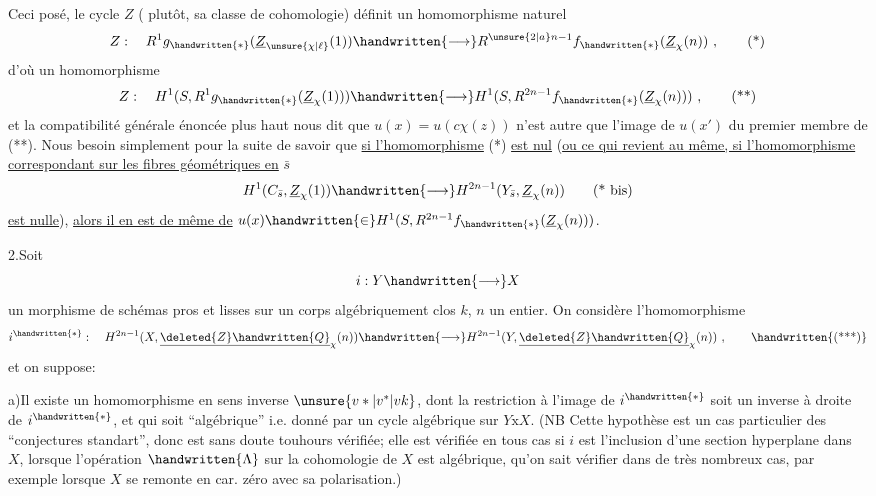 Ceci posé, le cycle $Z$ ( plutôt, sa classe de cohomologie) définit un homomorphisme naturel
\[
Z:\quad R^1g_{\handwritten{*}}(\underline{Z}_{\unsure{\chi|\ell}}(1))\handwritten{\longrightarrow}R^{\unsure{2|a}n-1}f_{\handwritten{*}}(\underline{Z}_{\chi}(n))\ ,\tag*{(*)}
\]
d'où un homomorphisme
\[
Z:\quad H^1(S,R^1g_{\handwritten{*}}(\underline{Z}_{\chi}(1)))\handwritten{\longrightarrow}H^1(S,R^{2n-1}f_{\handwritten{*}}(\underline{Z}_{\chi}(n)))\ ,\tag*{(**)}
\]
et la compatibilité générale énoncée plus haut nous dit que $u(x)=u(c\chi(z))$ n'est autre que l'image de $u(x')$ du premier membre de  (**). Nous  besoin simplement pour la suite de savoir que \uline{si l'homomorphisme} (*) \uline{est nul} (\uline{ou ce qui revient au même, si l'homomorphisme correspondant sur les fibres géométriques en} $\bar s$ 
\[
H^1(C_{\bar s},\underline{Z}_{\chi}(1))\handwritten{\longrightarrow}H^{2n-1}(Y_{\bar s},\underline{Z}_{\chi}(n))\tag*{(* bis)}
\]
\uline{est nulle}), \uline{alors il en est de même de} $u(x)\handwritten{\in}H^1(S,R^{2n-1}f_{\handwritten{*}}(\underline{Z}_{\chi}(n)))$.

2.\quad Soit
\[
i:Y\handwritten{\longrightarrow}X
\]
un morphisme de schémas pros et lisses sur un corps algébriquement clos $k$, $n$ un entier. On  considère l'homomorphisme
\[
i^{\handwritten{*}}:\quad H^{2n-1}(X,\underline{\deleted{Z}\handwritten{Q}}_{\chi}(n))\handwritten{\longrightarrow}H^{2n-1}(Y,\underline{\deleted{Z}\handwritten{Q}}_{\chi}(n))\ ,\tag*{\handwritten{(***)}}
\]
et on suppose:

a)\quad Il existe un homomorphisme en sens inverse $\unsure{v*|v^*|vk}$, dont la restriction à l'image de $i^{\handwritten{*}}$ soit un inverse à droite de $i^{\handwritten{*}}$, et qui soit ``algébrique'' i.e. donné par un cycle algébrique sur $Y\mathbin{\mathrm{x}}X$. (NB Cette hypothèse est un cas particulier des ``conjectures standart'', donc est sans doute touhours vérifiée; elle est vérifiée en tous cas si $i$ est l'inclusion d'une section hyperplane dans $X$, lorsque l'opération $\handwritten{\Lambda}$ sur  la cohomologie de $X$ est algébrique,   qu'on sait vérifier dans de très nombreux cas, par exemple lorsque $X$ se remonte en car. zéro avec sa polarisation.)
